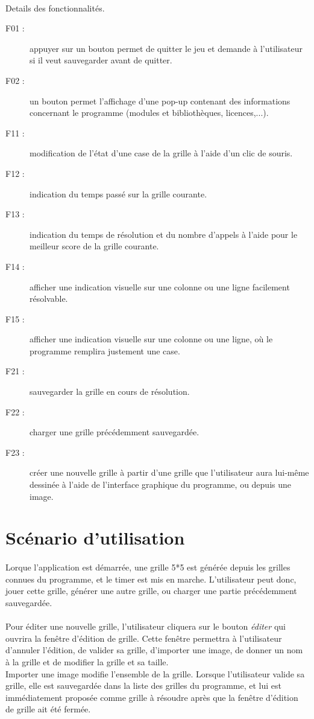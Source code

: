 	\paragraph*{}
	Details des fonctionnalités.
	\begin{description}
		\item[F01 :] appuyer sur un bouton permet de quitter le jeu et demande à l'utilisateur si il veut sauvegarder avant de quitter.
		\item[F02 :] un bouton permet l'affichage d'une pop-up contenant des informations concernant le programme (modules et bibliothèques, licences,...).
		\item[F11 :] modification de l'état d'une case de la grille à l'aide d'un clic de souris.
		\item[F12 :] indication du temps passé sur la grille courante.
		\item[F13 :] indication du temps de résolution et du nombre d'appels à l'aide pour le meilleur score de la grille courante.
		\item[F14 :] afficher une indication visuelle sur une colonne ou une ligne facilement résolvable. 
		\item[F15 :] afficher une indication visuelle sur une colonne ou une ligne, où le programme remplira justement une case.
		\item[F21 :] sauvegarder la grille en cours de résolution.
		\item[F22 :] charger une grille précédemment sauvegardée.
		\item[F23 :] créer une nouvelle grille  à partir d'une grille que l'utilisateur aura lui-même dessinée à l'aide  de l'interface graphique du programme, ou depuis une image.
	\end{description}


\section{Scénario d'utilisation}
	\paragraph*{}
	Lorque l'application est démarrée, une grille 5*5 est générée depuis les grilles connues du programme, et le timer est mis en marche. L'utilisateur peut donc, jouer cette grille, générer une autre grille, ou charger une partie précédemment sauvegardée.
	\paragraph*{}
	Pour éditer une nouvelle grille, l'utilisateur cliquera sur le bouton \textit{éditer} qui ouvrira la fenêtre d'édition de grille.
	Cette fenêtre permettra à l'utilisateur d'annuler l'édition, de valider sa grille, d'importer une image, de donner un nom à la grille et de modifier la grille et sa taille.\\
	Importer une image modifie l'ensemble de la grille.
	Lorsque l'utilisateur valide sa grille, elle est sauvegardée dans la liste des grilles du programme, et lui est immédiatement proposée comme grille à résoudre après que la fenêtre d'édition de grille ait été fermée.\\
